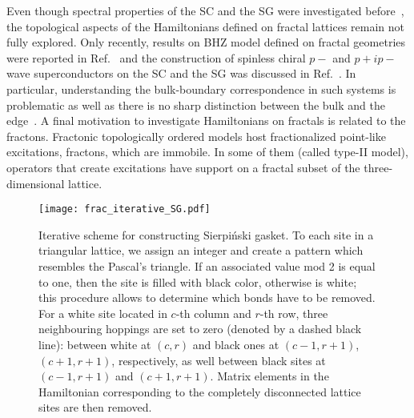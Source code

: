 Even though spectral properties of the SC and the SG were investigated before~\cite{GHEZ19871291,PhysRevB.29.5504, PhysRevLett.49.1194, PhysRevB.60.10054}, the topological aspects of the Hamiltonians defined on fractal lattices remain not fully explored. Only recently, results on BHZ model defined on fractal geometries were reported in Ref.~\cite{2018:BHZ} and the construction of spinless chiral $p-$ and $p +ip-$wave superconductors on the SC and the SG was discussed in Ref.~\cite{PaiFractal2019}. In particular, understanding the bulk-boundary correspondence in such systems is problematic as well as there is no sharp distinction between the bulk and the edge~\cite{EdgesFremling2020, KatnelsonFractal2020}. A final motivation to investigate Hamiltonians on fractals is related to the fractons. Fractonic topologically ordered models host fractionalized point-like excitations, fractons, which are immobile. In some of them (called type-II model), operators that create excitations have support on a fractal subset of the three-dimensional lattice. 

\begin{figure}[H]
\centering
\texttt{[image: frac\_iterative\_SG.pdf]} 
\caption[Iterative scheme for constructing Sierpiński gasket]{Iterative scheme for constructing Sierpiński gasket. To each site in a triangular lattice, we assign an integer and create a pattern which resembles the Pascal's triangle. If an associated value mod 2 is equal to one, then the site is filled with black color, otherwise is white; this procedure allows to determine which bonds have to be removed. For a white site located in $c$-th column and $r$-th row, three neighbouring hoppings are set to zero (denoted by a dashed black line): between white at $(c, r)$ and black ones at $(c-1, r + 1)$, $(c+1, r + 1)$, respectively, as well between black sites at $(c-1, r + 1)$ and $(c+1, r + 1)$. Matrix elements in the Hamiltonian corresponding to the completely disconnected lattice sites are then removed.}
\label{fig:iterative-SG}
\end{figure}

